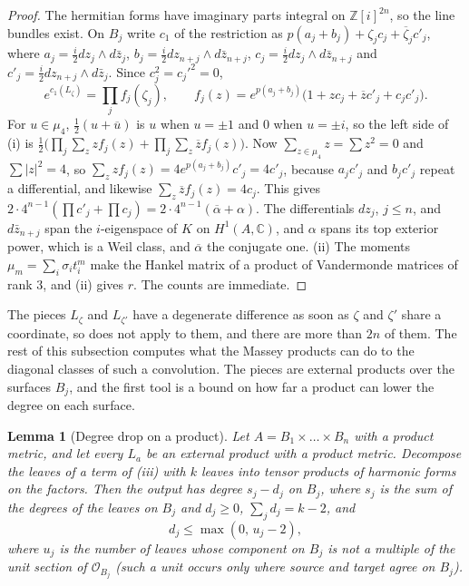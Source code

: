 \documentclass[11pt,reqno]{amsart}
\theoremstyle{plain}
\newtheorem{lemma}[theorem]{Lemma}
\theoremstyle{definition}
\theoremstyle{remark}
\newcommand{\ZZ}{\mathbb{Z}}
\newcommand{\CC}{\mathbb{C}}
\newcommand{\cO}{\mathcal{O}}
\newcommand{\bbar}[1]{\overline{#1}}
\begin{document}
\begin{proof}
The hermitian forms have imaginary parts integral on $\ZZ[i]^{2n}$, so the
line bundles exist. On $B_{j}$ write $c_{1}$ of the restriction as
$p(a_{j}+b_{j})+\zeta_{j}c_{j}+\bbar\zeta_{j}c'_{j}$, where
$a_{j}=\tfrac i2dz_{j}\wedge d\bar z_{j}$,
$b_{j}=\tfrac i2dz_{n+j}\wedge d\bar z_{n+j}$,
$c_{j}=\tfrac i2dz_{j}\wedge d\bar z_{n+j}$ and
$c'_{j}=\tfrac i2dz_{n+j}\wedge d\bar z_{j}$. Since $c_{j}^{2}=c_{j}'^{2}=0$,
\[
  e^{c_{1}(L_{\zeta})}=\prod_{j}f_{j}(\zeta_{j}),\qquad
  f_{j}(z)=e^{p(a_{j}+b_{j})}\bigl(1+zc_{j}+\bbar zc'_{j}+c_{j}c'_{j}\bigr).
\]
For
$u\in\mu_{4}$, $\tfrac12(u+\bbar u)$ is $u$ when $u=\pm1$ and $0$ when
$u=\pm i$, so the left side of (i) is
$\tfrac12\bigl(\prod_{j}\sum_{z}zf_{j}(z)+\prod_{j}\sum_{z}\bbar zf_{j}(z)\bigr)$.
Now $\sum_{z\in\mu_{4}}z=\sum z^{2}=0$ and $\sum|z|^{2}=4$, so
$\sum_{z}zf_{j}(z)=4e^{p(a_{j}+b_{j})}c'_{j}=4c'_{j}$, because $a_{j}c'_{j}$
and $b_{j}c'_{j}$ repeat a differential, and likewise
$\sum_{z}\bbar zf_{j}(z)=4c_{j}$. This gives
$2\cdot4^{n-1}(\prod c'_{j}+\prod c_{j})=2\cdot4^{n-1}(\bbar\alpha+\alpha)$.
The differentials $dz_{j}$, $j\le n$, and $d\bar z_{n+j}$ span the
$i$-eigenspace of $K$ on $H^{1}(A,\CC)$, and $\alpha$ spans its top exterior
power, which is a Weil class, and $\bbar\alpha$ the conjugate one. (ii) The
moments $\mu_{m}=\sum_{i}\sigma_{i}t_{i}^{m}$ make the Hankel matrix of
 a product of Vandermonde matrices of rank $3$, and
(ii) gives $r$. The counts are immediate.
\end{proof}

The pieces $L_{\zeta}$ and $L_{\zeta'}$ have a degenerate difference as soon
as $\zeta$ and $\zeta'$ share a coordinate, so  does not
apply to them, and there are more than $2n$ of them. The rest of this
subsection computes what the Massey products can do to the diagonal classes
of such a convolution. The pieces are external products over the surfaces
$B_{j}$, and the first tool is a bound on how far a product can lower the
degree on each surface.

\begin{lemma}[Degree drop on a product]\label{lem:degreedrop}
Let $A=B_{1}\times\dots\times B_{n}$ with a product metric, and let every
$L_{a}$ be an external product with a product metric. Decompose the leaves
of a term of (iii) with $k$ leaves into tensor
products of harmonic forms on the factors. Then the output has degree
$s_{j}-d_{j}$ on $B_{j}$, where $s_{j}$ is the sum of the degrees of the
leaves on $B_{j}$ and $d_{j}\ge0$, $\sum_{j}d_{j}=k-2$, and
\[
  d_{j}\le\max(0,\,u_{j}-2),
\]
where $u_{j}$ is the number of leaves whose component on $B_{j}$ is not a
multiple of the unit section of $\cO_{B_{j}}$ (such a unit occurs only where
source and target agree on $B_{j}$).
\end{lemma}
\end{document}
